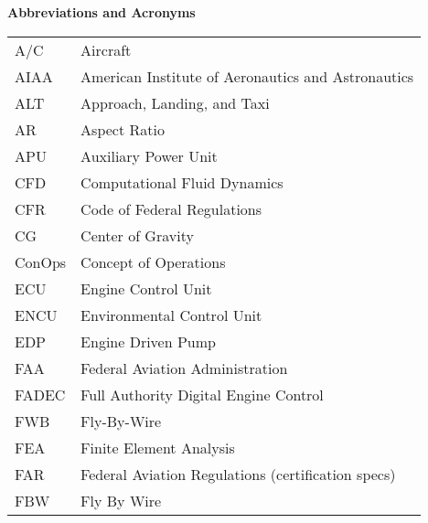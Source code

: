 \hspace{-0.5in}\textbf{Abbreviations and Acronyms}
{\renewcommand\arraystretch{1.0}
\noindent\begin{longtable*}{@{}l @{\quad=\quad} l@{}}
    A/C & Aircraft \\
    AIAA & American Institute of Aeronautics and Astronautics \\
    ALT & Approach, Landing, and Taxi \\
    AR & Aspect Ratio \\
    APU & Auxiliary Power Unit \\
    CFD & Computational Fluid Dynamics \\
    CFR & Code of Federal Regulations \\
    CG & Center of Gravity \\
    ConOps & Concept of Operations \\
    ECU & Engine Control Unit \\
    ENCU & Environmental Control Unit \\ 
    EDP & Engine Driven Pump \\
    FAA & Federal Aviation Administration \\
    FADEC & Full Authority Digital Engine Control \\
    FWB & Fly-By-Wire \\
    FEA & Finite Element Analysis \\
    FAR & Federal Aviation Regulations (certification specs) \\
    FBW & Fly By Wire \\

\end{longtable*}}

